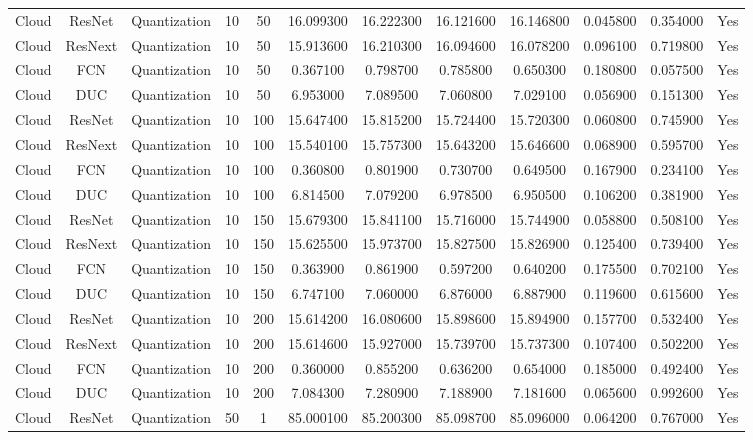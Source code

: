 \begin{tabular}{|c||c||c||c||c||c||c||c||c||c||c||c|}
Cloud & ResNet & Quantization & 10 & 50 & 16.099300 & 16.222300 & 16.121600 & 16.146800 & 0.045800 & 0.354000 & Yes \\
Cloud & ResNext & Quantization & 10 & 50 & 15.913600 & 16.210300 & 16.094600 & 16.078200 & 0.096100 & 0.719800 & Yes \\
Cloud & FCN & Quantization & 10 & 50 & 0.367100 & 0.798700 & 0.785800 & 0.650300 & 0.180800 & 0.057500 & Yes \\
Cloud & DUC & Quantization & 10 & 50 & 6.953000 & 7.089500 & 7.060800 & 7.029100 & 0.056900 & 0.151300 & Yes \\
Cloud & ResNet & Quantization & 10 & 100 & 15.647400 & 15.815200 & 15.724400 & 15.720300 & 0.060800 & 0.745900 & Yes \\
Cloud & ResNext & Quantization & 10 & 100 & 15.540100 & 15.757300 & 15.643200 & 15.646600 & 0.068900 & 0.595700 & Yes \\
Cloud & FCN & Quantization & 10 & 100 & 0.360800 & 0.801900 & 0.730700 & 0.649500 & 0.167900 & 0.234100 & Yes \\
Cloud & DUC & Quantization & 10 & 100 & 6.814500 & 7.079200 & 6.978500 & 6.950500 & 0.106200 & 0.381900 & Yes \\
Cloud & ResNet & Quantization & 10 & 150 & 15.679300 & 15.841100 & 15.716000 & 15.744900 & 0.058800 & 0.508100 & Yes \\
Cloud & ResNext & Quantization & 10 & 150 & 15.625500 & 15.973700 & 15.827500 & 15.826900 & 0.125400 & 0.739400 & Yes \\
Cloud & FCN & Quantization & 10 & 150 & 0.363900 & 0.861900 & 0.597200 & 0.640200 & 0.175500 & 0.702100 & Yes \\
Cloud & DUC & Quantization & 10 & 150 & 6.747100 & 7.060000 & 6.876000 & 6.887900 & 0.119600 & 0.615600 & Yes \\
Cloud & ResNet & Quantization & 10 & 200 & 15.614200 & 16.080600 & 15.898600 & 15.894900 & 0.157700 & 0.532400 & Yes \\
Cloud & ResNext & Quantization & 10 & 200 & 15.614600 & 15.927000 & 15.739700 & 15.737300 & 0.107400 & 0.502200 & Yes \\
Cloud & FCN & Quantization & 10 & 200 & 0.360000 & 0.855200 & 0.636200 & 0.654000 & 0.185000 & 0.492400 & Yes \\
Cloud & DUC & Quantization & 10 & 200 & 7.084300 & 7.280900 & 7.188900 & 7.181600 & 0.065600 & 0.992600 & Yes \\
Cloud & ResNet & Quantization & 50 & 1 & 85.000100 & 85.200300 & 85.098700 & 85.096000 & 0.064200 & 0.767000 & Yes \\

\end{tabular}
